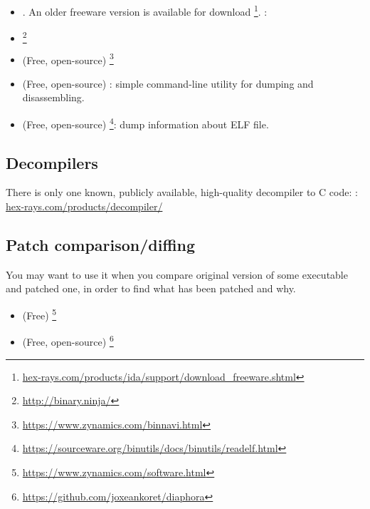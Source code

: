 
\begin{itemize}
\item {}. An older freeware version is available for download
\footnote{\href{http://go.yurichev.com/17031}{hex-rays.com/products/ida/support/download\_freeware.shtml}}.
\ShortHotKeyCheatsheet: 

\item {}\footnote{\url{http://binary.ninja/}}

\item (Free, open-source) \footnote{\url{https://www.zynamics.com/binnavi.html}}

\item (Free, open-source) : simple command-line utility for dumping and disassembling.

\item (Free, open-source) \footnote{\url{https://sourceware.org/binutils/docs/binutils/readelf.html}}:
dump information about ELF file.
\end{itemize}

\subsection{Decompilers}

There is only one known, publicly available, high-quality decompiler to C code: :\\
\href{http://go.yurichev.com/17033}{hex-rays.com/products/decompiler/}

\subsection{Patch comparison/diffing}

You may want to use it when you compare original version of some executable and patched one, in order to find
what has been patched and why.

\begin{itemize}
\item (Free) \footnote{\url{https://www.zynamics.com/software.html}}

\item (Free, open-source) \footnote{\url{https://github.com/joxeankoret/diaphora}}
\end{itemize}

